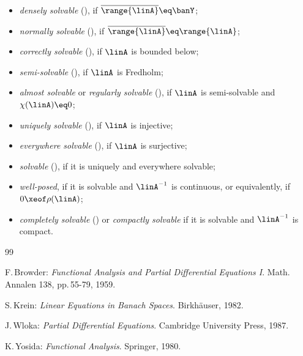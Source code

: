 \documentclass[11pt,twoside]{article}
\begin{document}
\begin{itemize}[leftmargin=15pt]
\item[(a)]
\textit{densely solvable} (\cite{II_Kr}),
if $\overline{\range{\linA}} \eq \banY$;

\item[(b)]
\textit{normally solvable} (\cite{II_Kr}),
if $\overline{\range{\linA}} \eq \range{\linA}$;

\item[(c)]
\textit{correctly solvable} (\cite{II_Kr}),
if $\linA$ is bounded below;

\item[(d)]
\textit{semi-solvable} (\cite{II_Br}), if $\linA$ is Fredholm;

\item[(e)]
\textit{almost solvable} or \textit{regularly solvable} (\cite{II_Br}),
if $\linA$ is semi-solvable and $\chi(\linA) \eq 0$;

\item[(f)]
\textit{uniquely solvable} (\cite{II_Kr}),
if $\linA$ is injective;

\item[(g)]
\textit{everywhere solvable} (\cite{II_Kr}),
if $\linA$ is surjective;

\item[(h)]
\textit{solvable} (\cite{II_Br}),
if it is uniquely and everywhere solvable;

\item[(i)]
\textit{well-posed},
if it is solvable and $\linA^{-1}$ is continuous,
or equivalently,
if $0 \xeof \rho(\linA)$;

\item[(j)]
\textit{completely solvable} (\cite{II_Br}) or \textit{compactly solvable}
if it is solvable and $\linA^{-1}$ is compact.
\end{itemize}

\vspace{5mm}
\begin{thebibliography}{99}
\begin{small}

 F.\,Browder:
\textit{Functional Analysis and Partial Differential Equations I}.
Math. Annalen 138, pp.\,55-79, 1959.

 S.\,Krein:
\textit{Linear Equations in Banach Spaces}.
Birk\-h\"{a}user, 1982.

 J.\,Wloka:
\textit{Partial Differential Equations}.
Cambridge University Press, 1987.

 K.\,Yosida:
\textit{Functional Analysis}.
Springer, 1980.

\end{small}
\end{thebibliography}
\end{document}
